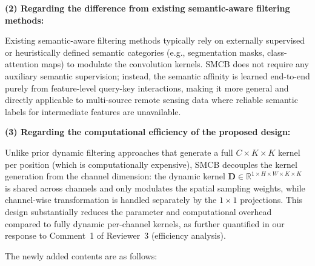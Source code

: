 \textbf{(2) Regarding the difference from existing semantic-aware filtering methods:}

Existing semantic-aware filtering methods typically rely on externally supervised or heuristically defined semantic categories (e.g., segmentation masks, class-attention maps) to modulate the convolution kernels. SMCB does not require any auxiliary semantic supervision; instead, the semantic affinity is learned end-to-end purely from feature-level query-key interactions, making it more general and directly applicable to multi-source remote sensing data where reliable semantic labels for intermediate features are unavailable.

\textbf{(3) Regarding the computational efficiency of the proposed design:}

Unlike prior dynamic filtering approaches that generate a full $C \times K \times K$ kernel per position (which is computationally expensive), SMCB decouples the kernel generation from the channel dimension: the dynamic kernel $\mathbf{D} \in \mathbb{R}^{1 \times H \times W \times K \times K}$ is shared across channels and only modulates the spatial sampling weights, while channel-wise transformation is handled separately by the $1\times1$ projections. This design substantially reduces the parameter and computational overhead compared to fully dynamic per-channel kernels, as further quantified in our response to Comment~1 of Reviewer~3 (efficiency analysis).

The newly added contents are as follows:

